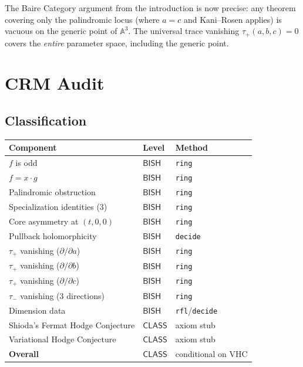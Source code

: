 \documentclass[11pt,a4paper]{article}
\theoremstyle{definition}
\theoremstyle{remark}
\newcommand{\Aff}{\mathbb{A}}
\newcommand{\BISH}{\mathsf{BISH}}
\newcommand{\CLASS}{\mathsf{CLASS}}
\begin{document}
The Baire Category argument from the introduction is now precise:
any theorem covering only the palindromic locus (where $a = c$ and
Kani--Rosen applies) is vacuous on the generic point of $\Aff^3$.
The universal trace vanishing $\tau_+(a,b,c) = 0$ covers the \emph{entire}
parameter space, including the generic point.


\section{CRM Audit}

\subsection{Classification}

\begin{center}
\begin{tabular}{@{}lll@{}}
\toprule
\textbf{Component} & \textbf{Level} & \textbf{Method} \\
\midrule
$f$ is odd & $\BISH$ & \texttt{ring} \\
$f = x \cdot g$ & $\BISH$ & \texttt{ring} \\
Palindromic obstruction & $\BISH$ & \texttt{ring} \\
Specialization identities (3) & $\BISH$ & \texttt{ring} \\
Core asymmetry at $(t,0,0)$ & $\BISH$ & \texttt{ring} \\
Pullback holomorphicity & $\BISH$ & \texttt{decide} \\
$\tau_+$ vanishing ($\partial/\partial a$) & $\BISH$ & \texttt{ring} \\
$\tau_+$ vanishing ($\partial/\partial b$) & $\BISH$ & \texttt{ring} \\
$\tau_+$ vanishing ($\partial/\partial c$) & $\BISH$ & \texttt{ring} \\
$\tau_-$ vanishing (3 directions) & $\BISH$ & \texttt{ring} \\
Dimension data & $\BISH$ & \texttt{rfl}/\texttt{decide} \\
Shioda's Fermat Hodge Conjecture & $\CLASS$ & axiom stub \\
Variational Hodge Conjecture & $\CLASS$ & axiom stub \\
\midrule
\textbf{Overall} & $\CLASS$ & conditional on VHC \\
\bottomrule
\end{tabular}
\end{center}
\end{document}
